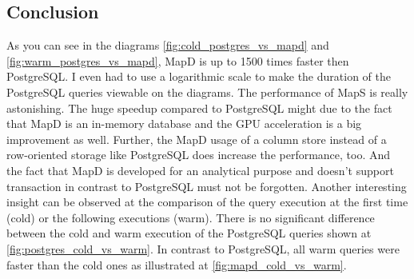 \subsection{Conclusion}
As you can see in the diagrams \ref{fig:cold_postgres_vs_mapd} and \ref{fig:warm_postgres_vs_mapd}, MapD is up to 1500 times faster then PostgreSQL.
I even had to use a logarithmic scale to make the duration of the PostgreSQL queries viewable on the diagrams.
The performance of MapS is really astonishing.
The huge speedup compared to PostgreSQL might due to the fact that MapD is an in-memory database and the GPU acceleration is a big improvement as well.
Further, the MapD usage of a column store instead of a row-oriented storage like PostgreSQL does increase the performance, too.
And the fact that MapD is developed for an analytical purpose and doesn't support transaction in contrast to PostgreSQL must not be forgotten.
Another interesting insight can be observed at the comparison of the query execution at the first time (cold) or the following executions (warm).
There is no significant difference between the cold and warm execution of the PostgreSQL queries shown at \ref{fig:postgres_cold_vs_warm}.
In contrast to PostgreSQL, all warm queries were faster than the cold ones as illustrated at \ref{fig:mapd_cold_vs_warm}.
